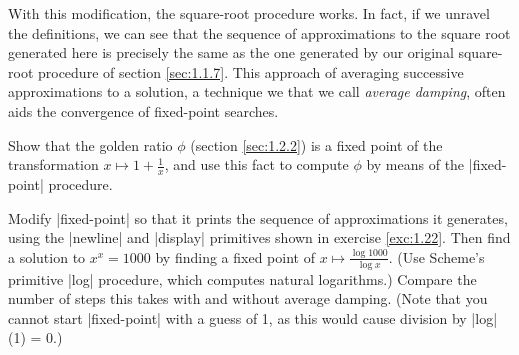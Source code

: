 With this modification, the square-root procedure works.  In fact, if
we unravel the definitions, we can see that the sequence of
approximations to the square root generated here is precisely the same
as the one generated by our original square-root procedure of section
\ref{sec:1.1.7}.  This approach of averaging successive approximations
to a solution, a technique we that we call \textit{average damping},
often aids the convergence of fixed-point searches.

\begin{Exercise}
\label{exc:1.35}
Show that the golden ratio $\phi$ (section \ref{sec:1.2.2}) is a fixed
point of the transformation $x \mapsto 1 + \frac{1}{x}$, and use this
fact to compute $\phi$ by means of the \scheme|fixed-point| procedure.
\end{Exercise}

\begin{Exercise}
\label{exc:1.36}
Modify \scheme|fixed-point| so that it prints the sequence of
approximations it generates, using the \scheme|newline| and
\scheme|display| primitives shown in exercise \ref{exc:1.22}.  Then
find a solution to $x^x = 1000$ by finding a fixed point of $x \mapsto
\frac{\log 1000}{\log x}$.  (Use Scheme's primitive \scheme|log|
procedure, which computes natural logarithms.)  Compare the number of
steps this takes with and without average damping.  (Note that you
cannot start \scheme|fixed-point| with a guess of 1, as this would
cause division by \scheme|log|(1) = 0.)
\end{Exercise}


